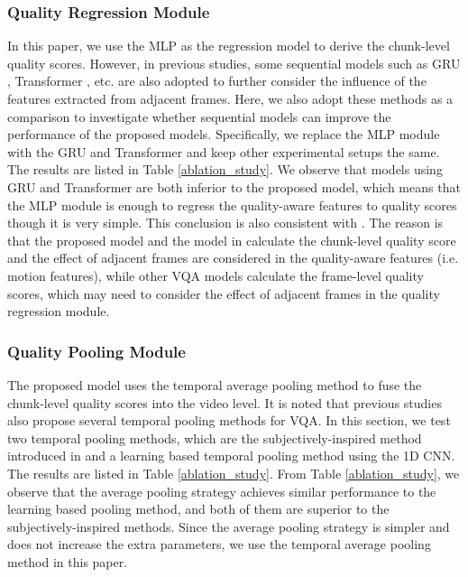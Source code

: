 \documentclass[sigconf]{acmart}
\begin{document}
\subsubsection{Quality Regression Module}
\label{quality_regression_module}
In this paper, we use the MLP as the regression model to derive the chunk-level quality scores. However, in previous studies, some sequential models such as GRU \cite{li2019quality}, Transformer \cite{li2021blindly}, etc. are also adopted to further consider the influence of the features extracted from adjacent frames. Here, we also adopt these methods as a comparison to investigate whether sequential models can improve the performance of the proposed models. Specifically, we replace the MLP module with the GRU and Transformer and keep other experimental setups the same. The results are listed in Table \ref{ablation_study}. We observe that models using GRU and Transformer are both inferior to the proposed model, which means that the MLP module is enough to regress the quality-aware features to quality scores though it is very simple. This conclusion is also consistent with \cite{wang2021rich}. The reason is that the proposed model and the model in \cite{wang2021rich} calculate the chunk-level quality score and the effect of adjacent frames are considered in the quality-aware features (i.e. motion features), while other VQA models \cite{li2019quality} \cite{li2021blindly} calculate the frame-level quality scores, which may need to consider the effect of adjacent frames in the quality regression module.









\subsubsection{Quality Pooling Module}
The proposed model uses the temporal average pooling method to fuse the chunk-level quality scores into the video level. It is noted that previous studies also propose several temporal pooling methods for VQA. 
In this section, we test two temporal pooling methods, which are the subjectively-inspired method introduced in \cite{li2019quality} and a learning based temporal pooling method using the 1D CNN. The results are listed in Table \ref{ablation_study}. From Table \ref{ablation_study}, we observe that the average pooling strategy achieves similar performance to the learning based pooling method, and both of them are superior to the subjectively-inspired methods. Since the average pooling strategy is simpler and does not increase the extra parameters, we use the temporal average pooling method in this paper.
\end{document}
